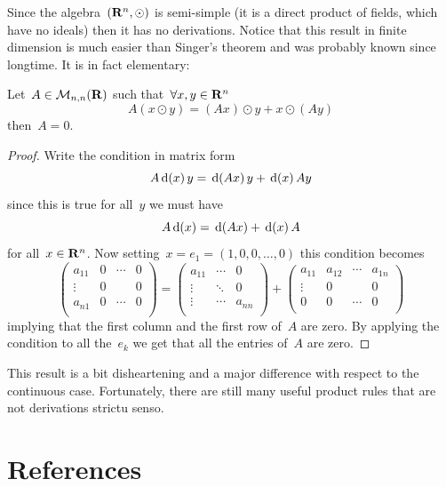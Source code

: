Since the algebra~$(\mathbf{R}^n,\odot)$ is semi-simple (it is a direct product of
fields, which have no ideals) then it has no derivations.  Notice that this
result in finite dimension is much easier than Singer's theorem and was
probably known since longtime.  It is in fact elementary:

\begin{proposition}
	Let~$A\in\mathcal{M}_{n,n}(\mathbf{R})$ such that~$\forall x,y\in\mathbf{R}^n$
	\[
		A\left(x\odot y\right)=\left(Ax\right)\odot y+x\odot\left(Ay\right)
	\]
	then~$A=0$.
\end{proposition}
\begin{proof}
	Write the condition in matrix form
	\[
		A\,\mathrm{d}\!\left(x\right)y=\,\mathrm{d}\!\left(Ax\right)y+\,\mathrm{d}\!\left(x\right)Ay
	\]
	since this is true for all~$y$ we must have
	\[
		A\,\mathrm{d}\!\left(x\right)=\,\mathrm{d}\!\left(Ax\right)+\,\mathrm{d}\!\left(x\right)A
	\]
	for all~$x\in\mathbf{R}^n$.  Now setting~$x=e_1=(1,0,0,\ldots,0)$ this condition
	becomes
	\[
		\begin{pmatrix}
			a_{11} & 0 & \cdots & 0 \\
			\vdots & 0 &  & 0 \\
			a_{n1} & 0 & \cdots & 0 \\
		\end{pmatrix}
		=
		\begin{pmatrix}
			a_{11} & \cdots & 0 \\
			\vdots & \ddots &  0 \\
			\vdots & \cdots & a_{nn} \\
		\end{pmatrix}
		+
		\begin{pmatrix}
			a_{11} & a_{12} & \cdots & a_{1n} \\
			\vdots & 0 &  & 0 \\
			0 & 0 & \cdots & 0 \\
		\end{pmatrix}
	\]
	implying that the first column and the first row of~$A$ are zero.  By
	applying the condition to all the~$e_k$ we get that all the entries of~$A$
	are zero.
\end{proof}
This result is a bit disheartening and a major difference with respect to the
continuous case.  Fortunately, there are still many useful product rules that
are not derivations strictu senso.

\section{References}

